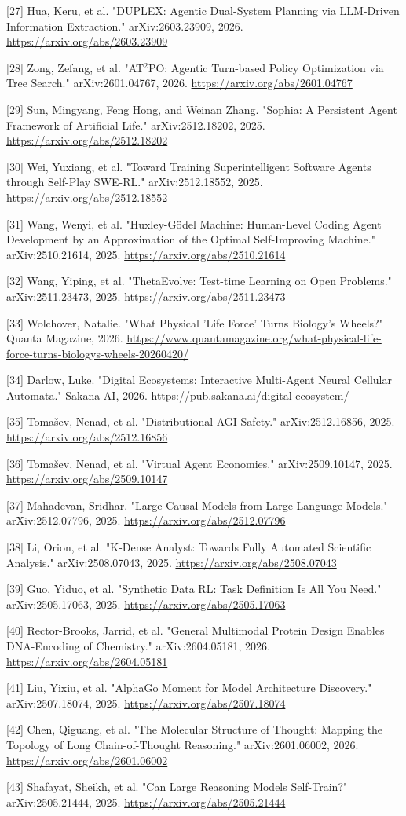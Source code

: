 \documentclass[
  11pt,
]{article}
\begin{document}
[27] Hua, Keru, et al. "DUPLEX: Agentic Dual-System Planning via LLM-Driven Information Extraction." arXiv:2603.23909, 2026. \url{https://arxiv.org/abs/2603.23909}

[28] Zong, Zefang, et al. "AT$^2$PO: Agentic Turn-based Policy Optimization via Tree Search." arXiv:2601.04767, 2026. \url{https://arxiv.org/abs/2601.04767}

[29] Sun, Mingyang, Feng Hong, and Weinan Zhang. "Sophia: A Persistent Agent Framework of Artificial Life." arXiv:2512.18202, 2025. \url{https://arxiv.org/abs/2512.18202}

[30] Wei, Yuxiang, et al. "Toward Training Superintelligent Software Agents through Self-Play SWE-RL." arXiv:2512.18552, 2025. \url{https://arxiv.org/abs/2512.18552}

[31] Wang, Wenyi, et al. "Huxley-Gödel Machine: Human-Level Coding Agent Development by an Approximation of the Optimal Self-Improving Machine." arXiv:2510.21614, 2025. \url{https://arxiv.org/abs/2510.21614}

[32] Wang, Yiping, et al. "ThetaEvolve: Test-time Learning on Open Problems." arXiv:2511.23473, 2025. \url{https://arxiv.org/abs/2511.23473}

[33] Wolchover, Natalie. "What Physical 'Life Force' Turns Biology's Wheels?" Quanta Magazine, 2026. \url{https://www.quantamagazine.org/what-physical-life-force-turns-biologys-wheels-20260420/}

[34] Darlow, Luke. "Digital Ecosystems: Interactive Multi-Agent Neural Cellular Automata." Sakana AI, 2026. \url{https://pub.sakana.ai/digital-ecosystem/}

[35] Tomašev, Nenad, et al. "Distributional AGI Safety." arXiv:2512.16856, 2025. \url{https://arxiv.org/abs/2512.16856}

[36] Tomašev, Nenad, et al. "Virtual Agent Economies." arXiv:2509.10147, 2025. \url{https://arxiv.org/abs/2509.10147}

[37] Mahadevan, Sridhar. "Large Causal Models from Large Language Models." arXiv:2512.07796, 2025. \url{https://arxiv.org/abs/2512.07796}

[38] Li, Orion, et al. "K-Dense Analyst: Towards Fully Automated Scientific Analysis." arXiv:2508.07043, 2025. \url{https://arxiv.org/abs/2508.07043}

[39] Guo, Yiduo, et al. "Synthetic Data RL: Task Definition Is All You Need." arXiv:2505.17063, 2025. \url{https://arxiv.org/abs/2505.17063}

[40] Rector-Brooks, Jarrid, et al. "General Multimodal Protein Design Enables DNA-Encoding of Chemistry." arXiv:2604.05181, 2026. \url{https://arxiv.org/abs/2604.05181}

[41] Liu, Yixiu, et al. "AlphaGo Moment for Model Architecture Discovery." arXiv:2507.18074, 2025. \url{https://arxiv.org/abs/2507.18074}

[42] Chen, Qiguang, et al. "The Molecular Structure of Thought: Mapping the Topology of Long Chain-of-Thought Reasoning." arXiv:2601.06002, 2026. \url{https://arxiv.org/abs/2601.06002}

[43] Shafayat, Sheikh, et al. "Can Large Reasoning Models Self-Train?" arXiv:2505.21444, 2025. \url{https://arxiv.org/abs/2505.21444}
\end{document}
